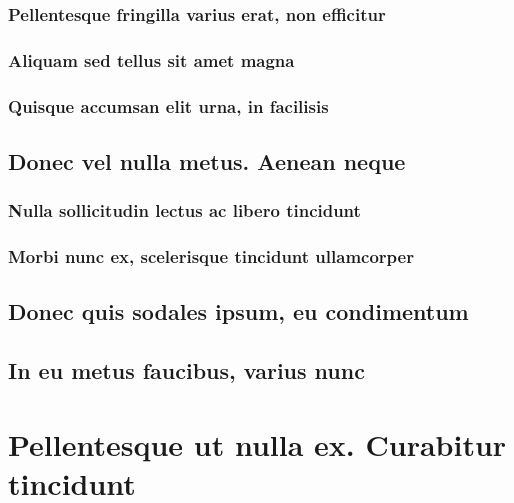 \documentclass[%
  german,%
  exercise,%
  oneside,%
]{iswartcl}
\begin{document}
\lipsum[1-8]

\subsubsection{Pellentesque fringilla varius erat, non efficitur}

\lipsum[1-8]

\subsubsection{Aliquam sed tellus sit amet magna}

\lipsum[1-8]

\subsubsection{Quisque accumsan elit urna, in facilisis}

\lipsum[1-8]

\subsection{Donec vel nulla metus. Aenean neque}

\lipsum[1-8]

\subsubsection{Nulla sollicitudin lectus ac libero tincidunt}

\lipsum[1-8]

\subsubsection{Morbi nunc ex, scelerisque tincidunt ullamcorper}

\lipsum[1-8]

\subsection{Donec quis sodales ipsum, eu condimentum}

\lipsum[1-8]

\subsection{In eu metus faucibus, varius nunc}

\lipsum[1-8]

\section{Pellentesque ut nulla ex. Curabitur tincidunt}
\end{document}
